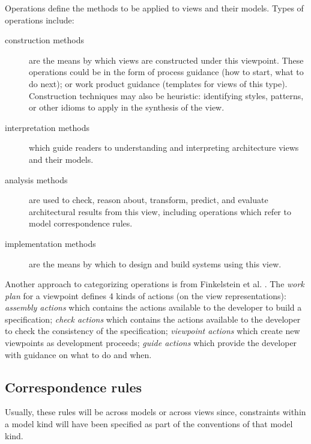 Operations define the methods to be applied to views and their models.
Types of operations include:

\begin{description}

\item[construction methods] are the means by which views are
  constructed under this viewpoint. These operations could be in the
  form of process guidance (how to start, what to do next); or work
  product guidance (templates for views of this type). Construction
  techniques may also be heuristic: identifying styles, patterns, or
  other idioms to apply in the synthesis of the view.

\item[interpretation methods] which guide readers to understanding
  and interpreting architecture views and their models.

\item[analysis methods] are used to check, reason about, transform,
  predict, and evaluate architectural results from this view,
  including operations which refer to model correspondence rules.

\item[implementation methods] are the means by which to design and
  build systems using this view.

\end{description}

Another approach to categorizing operations is from Finkelstein et
al. \cite{Finkelstein+1992}. The \emph{work plan} for a viewpoint
defines 4 kinds of actions (on the view representations):
\textit{assembly actions} which contains the actions available to the
developer to build a specification; \textit{check actions} which
contains the actions available to the developer to check the
consistency of the specification; \textit{viewpoint actions} which
create new viewpoints as development proceeds; \textit{guide actions}
which provide the developer with guidance on what to do and when.


\subsection{Correspondence rules}\label{CRs}


Usually, these rules will be across models or across views since,
constraints within a model kind will have been specified as part of
the conventions of that model kind.

